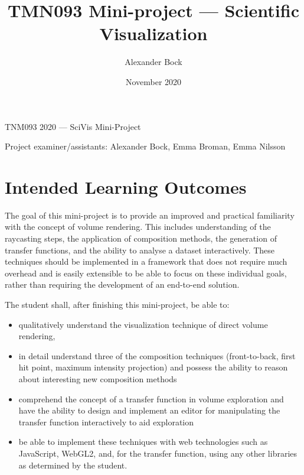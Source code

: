 \documentclass{labinstructions}
\begin{document}
\setcounter{page}{1}

\pagestyle{empty}


%
%
\begin{center}
{\Huge TNM093 2020 --- SciVis Mini-Project}
\vspace{0.6cm}

\Large{Project examiner/assistants: Alexander Bock, Emma Broman, Emma Nilsson}
\end{center}

\title{TMN093 Mini-project --- Scientific Visualization}
\author{Alexander Bock}
\date{November 2020}

\pagestyle{fancy}
\fancyfoot[c]{}
\fancyfoot[R]{\thepage}

\section{Intended Learning Outcomes}
The goal of this mini-project is to provide an improved and practical familiarity with the concept of volume rendering.  This includes understanding of the raycasting steps, the application of composition methods, the generation of transfer functions, and the ability to analyse a dataset interactively.  These techniques should be implemented in a framework that does not require much overhead and is easily extensible to be able to focus on these individual goals, rather than requiring the development of an end-to-end solution.

The student shall, after finishing this mini-project, be able to:
\begin{itemize}
  \item qualitatively understand the visualization technique of direct volume rendering,
  \item in detail understand three of the composition techniques (front-to-back, first hit point, maximum intensity projection) and possess the ability to reason about interesting new composition methods
  \item comprehend the concept of a transfer function in volume exploration and have the ability to design and implement an editor for manipulating the transfer function interactively to aid exploration
  \item be able to implement these techniques with web technologies such as JavaScript, WebGL2, and, for the transfer function, using any other libraries as determined by the student.
\end{itemize}{}
\end{document}
